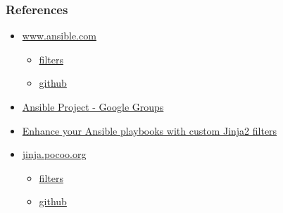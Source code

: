 \documentclass[pdf]{beamer}
\begin{document}
\begin{frame}
  \frametitle{References}
  \begin{itemize}
    \item
      \href{https://www.ansible.com/}{www.ansible.com}
      \begin{itemize}
        \item \href{http://docs.ansible.com/ansible/playbooks_filters.html}{filters}
        \item \href{https://github.com/ansible/ansible}{github}
      \end{itemize}
    \item
      \href{https://groups.google.com/d/forum/ansible-project}{Ansible Project - Google Groups}
    \item
      \href{https://opensolitude.com/2016/05/21/ansible-jinja2-filter-plugins.html}{Enhance your Ansible playbooks with custom Jinja2 filters}
    \item
      \href{http://jinja.pocoo.org/}{jinja.pocoo.org}
      \begin{itemize}
        \item \href{http://jinja.pocoo.org/docs/2.9/templates}{filters}
        \item \href{https://github.com/pallets/jinja}{github}
      \end{itemize}
  \end{itemize}
\end{frame}
\end{document}
